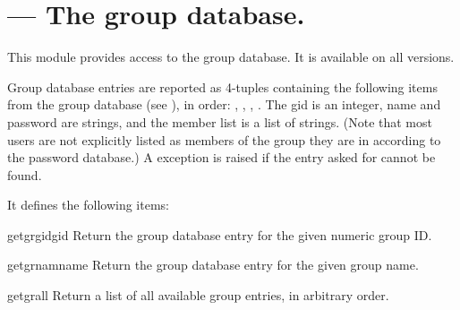\section{ ---
         The group database.}



This module provides access to the \UNIX{} group database.
It is available on all \UNIX{} versions.

Group database entries are reported as 4-tuples containing the
following items from the group database (see ), in order:
,
,
,
.
The gid is an integer, name and password are strings, and the member
list is a list of strings.
(Note that most users are not explicitly listed as members of the
group they are in according to the password database.)
A  exception is raised if the entry asked for cannot be found.

It defines the following items:

\begin{funcdesc}{getgrgid}{gid}
Return the group database entry for the given numeric group ID.
\end{funcdesc}

\begin{funcdesc}{getgrnam}{name}
Return the group database entry for the given group name.
\end{funcdesc}

\begin{funcdesc}{getgrall}{}
Return a list of all available group entries, in arbitrary order.
\end{funcdesc}
